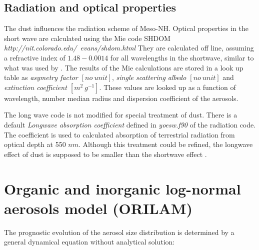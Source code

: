 \subsection{Radiation and optical properties}

The dust influences the radiation scheme of Meso-NH.
Optical properties in the 
short wave are calculated using the Mie code SHDOM \citep{Evans1998} 
{\it http://nit.colorado.edu/~evans/shdom.html}
They are calculated off line, assuming a refractive index of $1.48 -0.0014$ 
for all wavelengths in the shortwave, similar to what was used by 
\citet{Myhre2003}. The results of the Mie calculations are stored in a look up
table as {\it asymetry factor $[no~unit]$}, 
{\it single scattering albedo $[no~unit]$} and 
{\it extinction coefficient $[m^2~g^{-1}]$}.
These values are looked up as a function of wavelength, number median radius 
and dispersion coefficient of the aerosols. 

The long wave code is not modified for special treatment of dust. 
There is a default {\it Longwave absorption coefficient} defined in 
{\it yoesw.f90} of the radiation code. The coefficient is used
to calculated absorption of terrestrial radiation from optical depth at 
550 ${nm}$. Although this treatment could be refined, the longwave effect of 
dust is supposed to be smaller than the shortwave effect \citep{Myhre2003}. 


\section{Organic and inorganic log-normal aerosols model (ORILAM)}

The prognostic evolution of the aerosol size distribution is determined by a 
general dynamical
equation \citep{Friedlander1977,Seinfeld1997} without analytical 
solution: 

